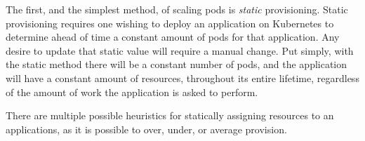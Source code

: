 The first, and the simplest method, of scaling pods is \textit{static}
provisioning. Static provisioning requires one wishing to deploy an application on
Kubernetes to determine ahead of time a constant amount of pods for that
application. Any desire to update that static value will require a manual
change. Put simply, with the static method there will be a constant number of
pods, and the application will have a constant amount of resources, throughout
its entire lifetime, regardless of the amount of work the application is asked
to perform.

There are multiple possible heuristics for statically assigning resources to an
applications, as it is possible to over, under, or average provision.


